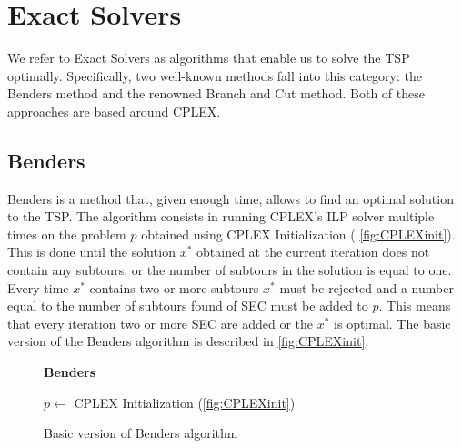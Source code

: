 \chapter{Exact Solvers}

We refer to Exact Solvers as algorithms that enable us to solve the TSP optimally.
Specifically, two well-known methods fall into this category: the Benders method and the renowned Branch and Cut method.
Both of these approaches are based around CPLEX.

\section{Benders}

Benders is a method that, given enough time, allows to find an optimal solution to the TSP.
The algorithm consists in running CPLEX's ILP solver multiple times on the problem $p$ obtained using CPLEX Initialization (\figurename{ \ref{fig:CPLEXinit}}).
This is done until the solution $x^*$ obtained at the current iteration does not contain any subtours, or the number of subtours in the solution is equal to one.
Every time $x^*$ contains two or more subtours $x^*$ must be rejected and a number equal to the number of subtours found of SEC must be added to $p$.
This means that every iteration two or more SEC are added or the $x^*$ is optimal.
The basic version of the Benders algorithm is described in \figurename{ \ref{fig:CPLEXinit}}.

\begin{figure}[htbp]
	\textbf{Benders} \\
	\begin{algorithm}[H]
		\vspace{2mm}
		$p \gets$ CPLEX Initialization (\ref{fig:CPLEXinit})\\
	\end{algorithm}
	\caption{Basic version of Benders algorithm} \label{fig:benders}
\end{figure}

